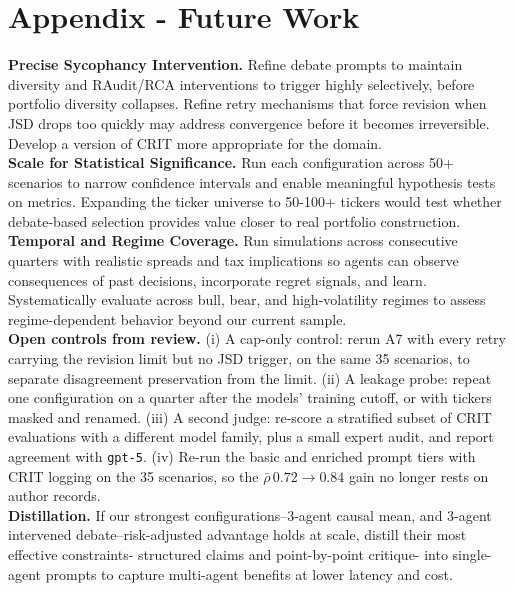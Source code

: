 \documentclass{article}
\begin{document}
\newpage
\appendix

\section{Appendix - Future Work}
\label{app:future-work}

\vspace{-0.01cm}
\vspace{-6pt}
\textbf{Precise Sycophancy Intervention.}
Refine debate prompts to maintain diversity and RAudit/RCA interventions to trigger highly selectively, before portfolio diversity collapses. Refine retry mechanisms that force revision when JSD drops too quickly may address convergence before it becomes irreversible. Develop a version of CRIT more appropriate for the domain.\\
\textbf{Scale for Statistical Significance.}
Run each configuration across 50+ scenarios to narrow confidence intervals and enable meaningful
hypothesis tests on metrics. Expanding the ticker universe to 50-100+ tickers would test whether debate-based selection provides value closer to real portfolio construction.\\
\textbf{Temporal and Regime Coverage.}
Run simulations across consecutive quarters with realistic spreads and tax implications so agents can observe consequences of past decisions, incorporate regret signals, and learn. Systematically evaluate across bull, bear, and high-volatility regimes
to assess regime-dependent behavior beyond our current sample.\\
\textbf{Open controls from review.}
(i) A cap-only control: rerun A7 with every retry carrying the revision limit but no JSD trigger,
on the same 35 scenarios, to separate disagreement preservation from the limit.
(ii) A leakage probe: repeat one configuration on a quarter after the models' training cutoff, or
with tickers masked and renamed.
(iii) A second judge: re-score a stratified subset of CRIT evaluations with a different model
family, plus a small expert audit, and report agreement with \texttt{gpt-5}.
(iv) Re-run the basic and enriched prompt tiers with CRIT logging on the 35 scenarios, so the
$\bar{\rho}\,0.72\!\to\!0.84$ gain no longer rests on author records.\\
\textbf{Distillation.}
If our strongest configurations--3-agent causal mean, and 3-agent intervened debate--risk-adjusted advantage holds at scale, distill their most effective
constraints- structured claims and point-by-point critique- into single-agent prompts to capture
multi-agent benefits at lower latency and cost.
\end{document}
